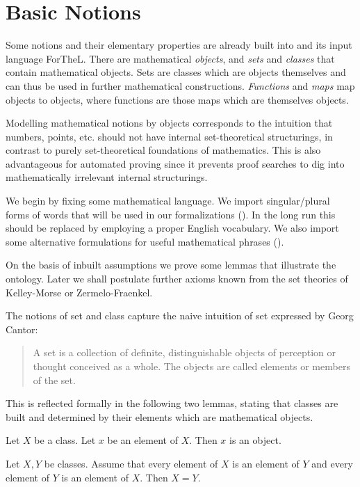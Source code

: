 \documentclass{article}
\begin{document}
\section{Basic Notions}

Some notions and their elementary properties are already
built into \Naproche{} and its input language
ForTheL. There are
mathematical {\em objects}, and {\em sets} and
{\em classes} that contain mathematical
objects. Sets are classes which are objects themselves and
can thus be used in further mathematical constructions.
{\em Functions}
and {\em maps} map objects to objects, where
functions are those
maps which are themselves objects.

Modelling mathematical notions by objects corresponds
to the intuition that numbers, points, etc. should
not have internal set-theoretical
structurings, in contrast to purely set-theoretical
foundations of mathematics. This is also advantageous
for automated proving since it prevents proof searches to
dig into mathematically irrelevant internal structurings.

We begin by fixing some mathematical language.
We import singular/plural forms of words that will be used in
our formalizations ().
In the long run this should be replaced by
employing a proper English vocabulary. We also
import some alternative formulations for
useful mathematical phrases ().

On the basis of inbuilt assumptions we prove some
lemmas that illustrate the \Naproche{} ontology.
Later we shall postulate further axioms known from the
set theories of Kelley-Morse or Zermelo-Fraenkel.

The notions of set and class capture the naive intuition
of set expressed by Georg Cantor:
%
\begin{quotation}
\noindent A set is a collection of definite, distinguishable objects
of perception or thought conceived as a whole.
The objects are called elements or members of the set.
\end{quotation}
%
This is reflected formally in the following two lemmas, stating
that classes are built and determined by their
elements which are mathematical objects.

\begin{forthel}

\begin{proposition}
Let $X$ be a class. Let $x$ be an element of $X$.
Then $x$ is an object.
\end{proposition}

\begin{lemma}[title=Extensionality Axiom]
    Let $X, Y$ be classes.
    Assume that every element of $X$ is an element of $Y$ and every element of
    $Y$ is an element of $X$.
    Then $X = Y$.
\end{lemma}

\end{forthel}
\end{document}
